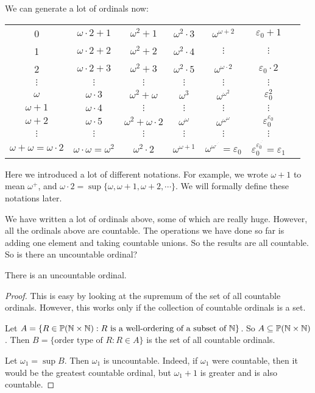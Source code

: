 \documentclass[a4paper]{article}
\begin{document}
We can generate a lot of ordinals now:
\begin{center}
  \begin{tabular}{ccccccc}
    0 & $\omega\cdot 2 + 1$ & $\omega^2 + 1$ & $\omega^2\cdot 3$ & $\omega^{\omega + 2}$ & $\varepsilon_0 + 1$ \\
    1 & $\omega\cdot 2 + 2$ & $\omega^2 + 2$ & $\omega^2\cdot 4$ & $\vdots$ & $\vdots$ \\
    2 & $\omega\cdot 2 + 3$ & $\omega^2 + 3$ & $\omega^2\cdot 5$ & $\omega^{\omega \cdot 2}$ & $\varepsilon_0 \cdot 2$ \\
    $\vdots$ & $\vdots$ & $\vdots$ & $\vdots$ & $\vdots$ & $\vdots$ \\
    $\omega$ & $\omega\cdot 3$ & $\omega^2 + \omega$ & $\omega^3$ & $\omega^{\omega^2}$ & $\varepsilon_0^2$ \\
    $\omega + 1$ & $\omega\cdot 4$ & $\vdots$ & $\vdots$ & $\vdots$ & $\vdots$ \\
    $\omega + 2$ & $\omega\cdot 5$ & $\omega^2 + \omega \cdot 2$ & $\omega^\omega$ & $\omega^{\omega^{\omega}}$ & $\varepsilon_0^{\varepsilon_0}$ \\
    $\vdots$ & $\vdots$ & $\vdots$ & $\vdots$ & $\vdots$ & $\vdots$ \\
    $\omega + \omega = \omega\cdot 2$ & $\omega\cdot \omega = \omega^2$ & $\omega^2 \cdot 2$ & $\omega^{\omega + 1}$ & $\omega^{\omega^{.^{.^.}}} = \varepsilon_0$ & $\varepsilon_0^{\varepsilon_0^{.^{.^.}}} = \varepsilon_1$ \\
  \end{tabular}
\end{center}
Here we introduced a lot of different notations. For example, we wrote $\omega + 1$ to mean $\omega^+$, and $\omega\cdot 2 = \sup\{\omega, \omega + 1, \omega + 2, \cdots\}$. We will formally define these notations later.

We have written a lot of ordinals above, some of which are really huge. However, all the ordinals above are countable. The operations we have done so far is adding one element and taking countable unions. So the results are all countable. So is there an uncountable ordinal?

\begin{thm}
  There is an uncountable ordinal.
\end{thm}

\begin{proof}
  This is easy by looking at the supremum of the set of all countable ordinals. However, this works only if the collection of countable ordinals is a set.

  Let $A = \{R\in \mathbb{P}(\mathbb{N}\times \mathbb{N}): R \text{ is a well-ordering of a subset of }\mathbb{N}\}$. So $A \subseteq \mathbb{P}(\mathbb{N}\times \mathbb{N})$. Then $B = \{\text{order type of }R: R\in A\}$ is the set of all countable ordinals.

  Let $\omega_1 = \sup B$. Then $\omega_1$ is uncountable. Indeed, if $\omega_1$ were countable, then it would be the greatest countable ordinal, but $\omega_1 + 1$ is greater and is also countable.
\end{proof}
\end{document}
